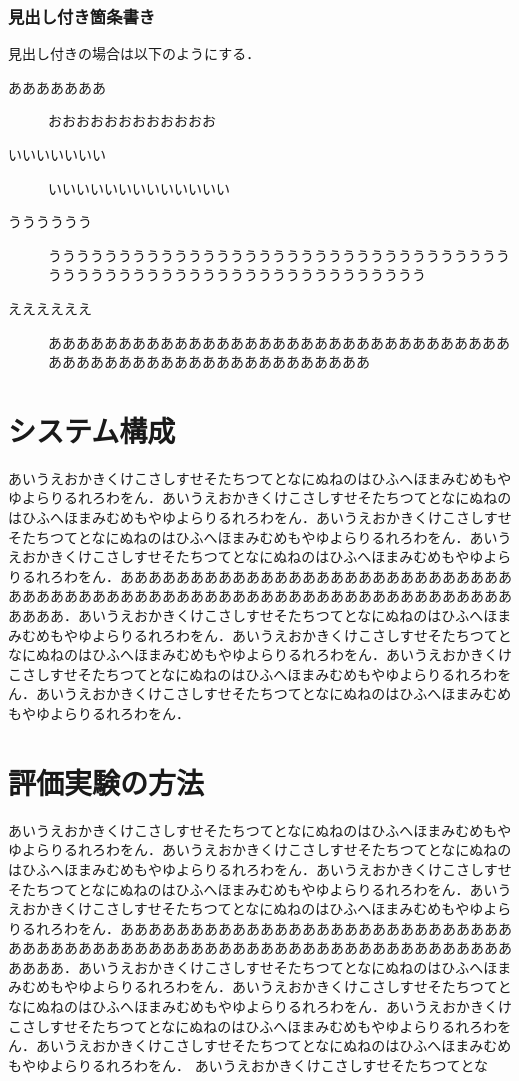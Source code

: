 \begin{multicols*}{2}
\subsubsection{見出し付き箇条書き}
見出し付きの場合は以下のようにする．
\begin{description}
 \item[あああああああ]おおおおおおおおおおおお
 \item[いいいいいいい]いいいいいいいいいいいいい
 \item[うううううう]うううううううううううううううううううううううううううううううううううううううううううううううううううううううううううう
 \item[ええええええ]ああああああああああああああああああああああああああああああああああああああああああああああああああああああああ
\end{description}



\section{システム構成}
	あいうえおかきくけこさしすせそたちつてとなにぬねのはひふへほまみむめもやゆよらりるれろわをん．あいうえおかきくけこさしすせそたちつてとなにぬねのはひふへほまみむめもやゆよらりるれろわをん．あいうえおかきくけこさしすせそたちつてとなにぬねのはひふへほまみむめもやゆよらりるれろわをん．あいうえおかきくけこさしすせそたちつてとなにぬねのはひふへほまみむめもやゆよらりるれろわをん．ああああああああああああああああああああああああああああああああああああああああああああああああああああああああああああああああああああ．あいうえおかきくけこさしすせそたちつてとなにぬねのはひふへほまみむめもやゆよらりるれろわをん．あいうえおかきくけこさしすせそたちつてとなにぬねのはひふへほまみむめもやゆよらりるれろわをん．あいうえおかきくけこさしすせそたちつてとなにぬねのはひふへほまみむめもやゆよらりるれろわをん．あいうえおかきくけこさしすせそたちつてとなにぬねのはひふへほまみむめもやゆよらりるれろわをん．
	\section{評価実験の方法}
	あいうえおかきくけこさしすせそたちつてとなにぬねのはひふへほまみむめもやゆよらりるれろわをん．あいうえおかきくけこさしすせそたちつてとなにぬねのはひふへほまみむめもやゆよらりるれろわをん．あいうえおかきくけこさしすせそたちつてとなにぬねのはひふへほまみむめもやゆよらりるれろわをん．あいうえおかきくけこさしすせそたちつてとなにぬねのはひふへほまみむめもやゆよらりるれろわをん．ああああああああああああああああああああああああああああああああああああああああああああああああああああああああああああああああああああ．あいうえおかきくけこさしすせそたちつてとなにぬねのはひふへほまみむめもやゆよらりるれろわをん．あいうえおかきくけこさしすせそたちつてとなにぬねのはひふへほまみむめもやゆよらりるれろわをん．あいうえおかきくけこさしすせそたちつてとなにぬねのはひふへほまみむめもやゆよらりるれろわをん．あいうえおかきくけこさしすせそたちつてとなにぬねのはひふへほまみむめもやゆよらりるれろわをん．	あいうえおかきくけこさしすせそたちつてとな



\end{multicols*}
